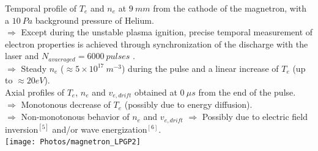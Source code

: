 \documentclass{beamer}
\begin{document}
\begin{frame}[t]
\begin{tcbposter}
{\begin{columns}
   		\begin{column}[T]{0.22\paperwidth}
		\vspace{0.0275\paperwidth}%
		Temporal profile of $T_{e}$ and $n_{e}$ at $9 \ mm$ from the cathode of the magnetron, with a $10 \ Pa$ background pressure of Helium.\\
  		$\Rightarrow$ Except during the unstable plasma ignition, precise temporal measurement of electron properties is achieved through synchronization of the discharge with the laser and $N_{avaeraged}= 6000 \ pulses$ .\\
   		$\Rightarrow$ Steady $n_{e}$ ($\approx 5\times 10^{17} \ m^{-3}$) during the pulse and a linear increase of $T_{e}$ (up to $\approx 20 eV$). \\
		\vspace{0.06\paperwidth}%
		Axial profiles of $T_{e}$, $n_{e}$ and $v_{e,drift}$ obtained at $0 \ \mu s$ from the end of the pulse.\\
		$\Rightarrow$ Monotonous decrease of  $T_{e}$ (possibly due to energy diffusion).\\
		$\Rightarrow$ Non-monotonous behavior of  $n_{e}$ and $v_{e,drift}$ $\Rightarrow$ Possibly due to electric field inversion$^{[5]}$ and/or wave energization$^{[6]}$. \\ 
   		\vspace{0.046\paperwidth}%
	    \texttt{[image: Photos/magnetron\_LPGP2]} 
        \end{column}
        
	\end{columns}           
   	}
\end{tcbposter}  
   
\vspace{0.02\paperwidth}  

\begin{tcbposter}[
	poster = {columns=100,rows=1,colspacing=0mm , width=\paperwidth},
    no coverage ,
    boxes = {beamer,arc=10mm,colback=bleuet, colframe=bleuet, no shadow, , interior titled empty}]%
   
   	\end{tcbposter}   
     
\end{frame}
\end{document}
